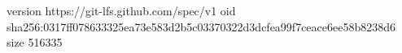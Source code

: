 version https://git-lfs.github.com/spec/v1
oid sha256:0317ff078633325ea73e583d2b5c03370322d3dcfea99f7ceace6ee58b8238d6
size 516335
